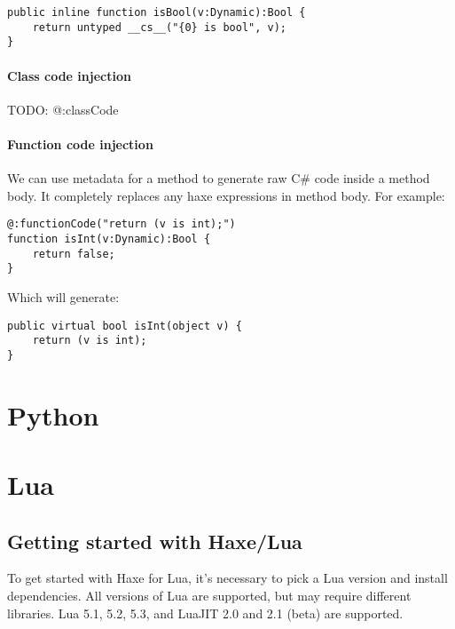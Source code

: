 \begin{lstlisting}
public inline function isBool(v:Dynamic):Bool {
    return untyped __cs__("{0} is bool", v);
}
\end{lstlisting}

\paragraph{Class code injection}

TODO: @:classCode

\paragraph{Function code injection}

We can use  metadata for a method to generate raw C\# code inside a method body. It completely replaces any haxe expressions in method body. For example:

\begin{lstlisting}
@:functionCode("return (v is int);")
function isInt(v:Dynamic):Bool {
    return false;
}
\end{lstlisting}

Which will generate:

\begin{lstlisting}
public virtual bool isInt(object v) {
    return (v is int);
}
\end{lstlisting}


\section{Python}
\label{target-python}



\section{Lua}
\label{target-lua}

\subsection{Getting started with Haxe/Lua}
\label{target-lua-getting-started}

To get started with Haxe for Lua, it's necessary to pick a Lua version and install
dependencies.  All versions of Lua are supported, but may require different
libraries.  Lua 5.1, 5.2, 5.3, and LuaJIT 2.0 and 2.1 (beta) are supported.

